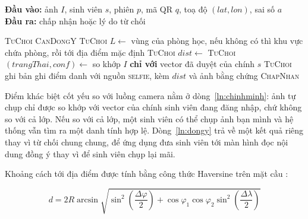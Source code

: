 \begin{algorithm}[H]
\caption{Sinh viên tự điểm danh bằng ảnh tự chụp và vị trí}
\label{alg:tudiemdanh}
\hspace*{\algorithmicindent}\textbf{Đầu vào:} ảnh $I$, sinh viên $s$, phiên $p$, mã QR $q$, toạ độ $(lat, lon)$, sai số $a$\\
\hspace*{\algorithmicindent}\textbf{Đầu ra:} chấp nhận hoặc lý do từ chối
\begin{algorithmic}[1]
    \State \Return \textsc{TuChoi}
  \EndIf
   \label{ln:dongy}
    \State \Return \textsc{CanDongY} 
  \EndIf
   \label{ln:qr}
    \State \Return \textsc{TuChoi}
  \EndIf
  \State $L \gets$ vùng của phòng học, nếu không có thì khu vực chứa phòng, rồi tới địa điểm mặc định
      \State \Return \textsc{TuChoi}
    \EndIf
    \State $dist \gets$ 
      \State \Return \textsc{TuChoi} 
    \EndIf
  \EndIf
  \State $(trangThai, conf) \gets$ so khớp $I$ \textbf{chỉ với} vector đã
         duyệt của chính $s$ \label{ln:chinhminh}
    \State \Return \textsc{TuChoi}
  \EndIf
  \State ghi bản ghi điểm danh với nguồn \textsc{selfie}, kèm $dist$ và ảnh bằng chứng
  \State \Return \textsc{ChapNhan}
\EndFunction
\end{algorithmic}
\end{algorithm}

Điểm khác biệt cốt yếu so với luồng camera nằm ở dòng~\ref{ln:chinhminh}:
ảnh tự chụp chỉ được so khớp với vector của chính sinh viên đang đăng nhập,
chứ không so với cả lớp. Nếu so với cả lớp, một sinh viên có thể chụp ảnh bạn
mình và hệ thống vẫn tìm ra một danh tính hợp lệ. Dòng~\ref{ln:dongy} trả về
một kết quả riêng thay vì từ chối chung chung, để ứng dụng đưa sinh viên tới
màn hình đọc nội dung đồng ý thay vì để sinh viên chụp lại mãi.

Khoảng cách tới địa điểm được tính bằng công thức Haversine trên mặt cầu \cite{Sinnott1984Haversine}:

\begin{equation}
\label{eq:haversine}
d = 2R \arcsin \sqrt{ \sin^2\!\left(\frac{\Delta\varphi}{2}\right)
+ \cos\varphi_1 \cos\varphi_2 \sin^2\!\left(\frac{\Delta\lambda}{2}\right) }
\end{equation}

